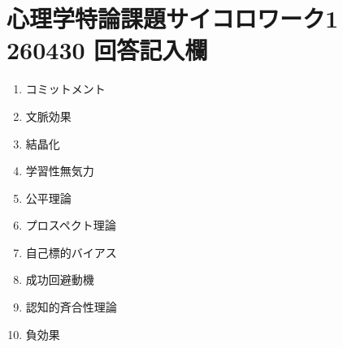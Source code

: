 \documentclass[titlepage,a4paper]{jsarticle}
\begin{document}
\section{心理学特論課題サイコロワーク1 260430 回答記入欄}
\begin{enumerate}
  \item コミットメント
  \item 文脈効果
  \item 結晶化
  \item 学習性無気力
  \item 公平理論
  \item プロスペクト理論
  \item 自己標的バイアス
  \item 成功回避動機
  \item 認知的斉合性理論
  \item 負効果

\end{enumerate}
\end{document}
